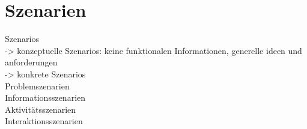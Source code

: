 
\section{Szenarien}

Szenarios\\
-> konzeptuelle Szenarios: keine funktionalen Informationen, generelle ideen und anforderungen\\
-> konkrete Szenarios\\
Problemszenarien\\
Informationsszenarien\\
Aktivitätsszenarien\\
Interaktionsszenarien\\
